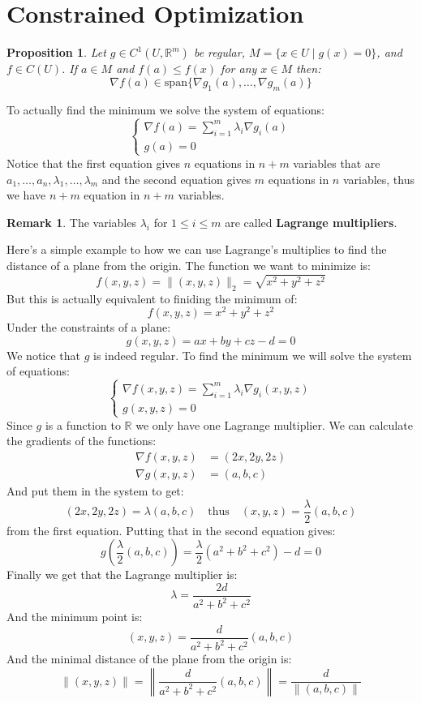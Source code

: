 \documentclass[11pt,a4paper]{article}
\theoremstyle{definition}
\newtheorem{remark}{Remark}[section]
\theoremstyle{plain}
\newtheorem{proposition}[theorem]{Proposition}
\newcommand{\R}{\mathbb{R}}
\begin{document}
	\newpage
	
	\section{Constrained Optimization}
	\begin{proposition}
		Let $g \in C^1(U,\R^m)$ be regular,
		$M = \{x \in U \mid g(x) = 0\}$, and $f \in C(U)$. If $a \in M$ and
		$f(a) \le f(x)$ for any $x \in M$ then:
		\[
			\nabla f(a) \in \mathrm{span}\{\nabla g_1(a),\dots,\nabla g_m(a)\}
		\]
	\end{proposition}
	\noindent
	To actually find the minimum we solve the system of equations:
	\[
		\begin{cases}
			\nabla f(a) = \sum_{i = 1}^{m}{\lambda_i \nabla g_i(a)} \\
			g(a) = 0
		\end{cases}
	\]
	Notice that the first equation gives $n$ equations in $n + m$ variables
	that are $a_1,\dots,a_n,\lambda_1,\dots,\lambda_m$ and the second
	equation gives $m$ equations in $n$ variables, thus we have $n + m$
	equation in $n + m$ variables.
	\begin{remark}
		The variables $\lambda_i$ for $1 \le i \le m$ are called
		\textbf{Lagrange multipliers}.
	\end{remark}
	Here's a simple example to how we can use Lagrange's multiplies to find
	the distance of a plane from the origin. The function we want to minimize
	is:
	\[
		f(x,y,z) = \|(x,y,z)\|_2 = \sqrt{x^2 + y^2 + z^2}
	\]
	But this is actually equivalent to finiding the minimum of:
	\[
		f(x,y,z) = x^2 + y^2 + z^2
	\]
	Under the constraints of a plane:
	\[
		g(x,y,z) = ax + by + cz - d = 0
	\]
	We notice that $g$ is indeed regular. To find the minimum we will solve
	the system of equations:
	\[
		\begin{cases}
			\nabla f(x,y,z) = \sum_{i = 1}^{m}{\lambda_i \nabla g_i(x,y,z)} \\
			g(x,y,z) = 0
		\end{cases}
	\]
	Since $g$ is a function to $\R$ we only have one Lagrange multiplier.
	We can calculate the gradients of the functions:
	\begin{align*}
		\nabla f(x,y,z) &= (2x,2y,2z) \\
		\nabla g(x,y,z) &= (a,b,c)
	\end{align*}
	And put them in the system to get:
	\[
		(2x,2y,2z) = \lambda (a,b,c) \quad\text{thus}\quad
		(x,y,z) = \frac{\lambda}{2} (a,b,c)
	\]
	from the first equation. Putting that in the second equation gives:
	\[
		g\left(\frac{\lambda}{2} (a,b,c)\right) = 
		\frac{\lambda}{2}(a^2 + b^2 + c^2) - d = 0
	\]
	Finally we get that the Lagrange multiplier is:
	\[
		\lambda = \frac{2d}{a^2 + b^2 + c^2}
	\]
	And the minimum point is:
	\[
		(x,y,z) = \frac{d}{a^2 + b^2 + c^2} (a,b,c)
	\]
	And the minimal distance of the plane from the origin is:
	\[
		\|(x,y,z)\| = \left\|\frac{d}{a^2 + b^2 + c^2} (a,b,c)\right\| = 
		\frac{d}{\|(a,b,c)\|}
	\]
	
\end{document}
